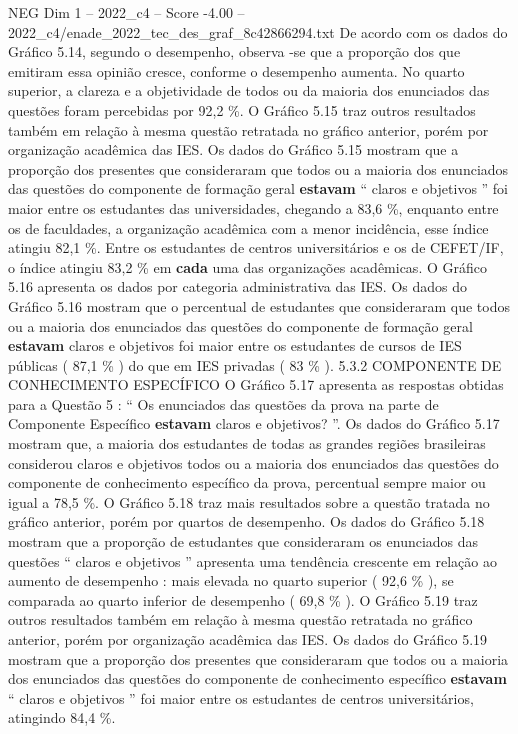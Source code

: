 \begin{textsample}{NEG Dim 1 – 2022\_c4 – Score -4.00 – 2022\_c4/enade\_2022\_tec\_des\_graf\_8c42866294.txt}
De acordo com os dados do Gráfico 5.14, segundo o desempenho, observa -se que a proporção dos que emitiram essa opinião cresce, conforme o desempenho aumenta.
No quarto superior, a clareza e a objetividade de todos ou da maioria dos enunciados das questões foram percebidas por 92,2 \%.
O Gráfico 5.15 traz outros resultados também em relação à mesma questão retratada no gráfico anterior, porém por organização acadêmica das IES.
Os dados do Gráfico 5.15 mostram que a proporção dos presentes que consideraram que todos ou a maioria dos enunciados das questões do componente de formação geral \textbf{estavam} “ claros e objetivos ” foi maior entre os estudantes das universidades, chegando a 83,6 \%, enquanto entre os de faculdades, a organização acadêmica com a menor incidência, esse índice atingiu 82,1 \%.
Entre os estudantes de centros universitários e os de CEFET/IF, o índice atingiu 83,2 \% em \textbf{cada} uma das organizações acadêmicas.
O Gráfico 5.16 apresenta os dados por categoria administrativa das IES.
Os dados do Gráfico 5.16 mostram que o percentual de estudantes que consideraram que todos ou a maioria dos enunciados das questões do componente de formação geral \textbf{estavam} claros e objetivos foi maior entre os estudantes de cursos de IES públicas ( 87,1 \% ) do que em IES privadas ( 83 \% ). 5.3.2 COMPONENTE DE CONHECIMENTO ESPECÍFICO O Gráfico 5.17 apresenta as respostas obtidas para a Questão 5 : “ Os enunciados das questões da prova na parte de Componente Específico \textbf{estavam} claros e objetivos? ”.
Os dados do Gráfico 5.17 mostram que, a maioria dos estudantes de todas as grandes regiões brasileiras considerou claros e objetivos todos ou a maioria dos enunciados das questões do componente de conhecimento específico da prova, percentual sempre maior ou igual a 78,5 \%.
O Gráfico 5.18 traz mais resultados sobre a questão tratada no gráfico anterior, porém por quartos de desempenho.
Os dados do Gráfico 5.18 mostram que a proporção de estudantes que consideraram os enunciados das questões “ claros e objetivos ” apresenta uma tendência crescente em relação ao aumento de desempenho : mais elevada no quarto superior ( 92,6 \% ), se comparada ao quarto inferior de desempenho ( 69,8 \% ).
O Gráfico 5.19 traz outros resultados também em relação à mesma questão retratada no gráfico anterior, porém por organização acadêmica das IES.
Os dados do Gráfico 5.19 mostram que a proporção dos presentes que consideraram que todos ou a maioria dos enunciados das questões do componente de conhecimento específico \textbf{estavam} “ claros e objetivos ” foi maior entre os estudantes de centros universitários, atingindo 84,4 \%.

\end{textsample}
